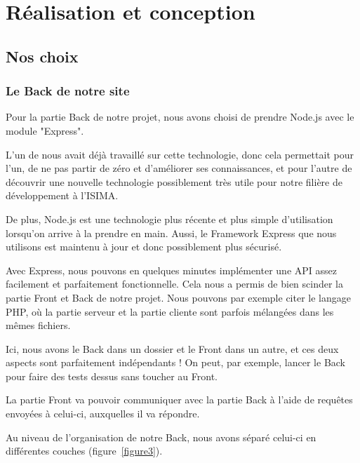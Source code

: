 \documentclass[12pt,french]{article}
\begin{document}
\section{Réalisation et conception}

\subsection{Nos choix}

\subsubsection{Le Back de notre site}

Pour la partie \gls{Back} de notre projet, nous avons choisi de prendre Node.js avec le module "Express".

\medskip

L'un de nous avait déjà travaillé sur cette technologie, donc cela permettait pour l'un, de ne pas partir de zéro et d'améliorer ses connaissances, et pour l'autre de découvrir une nouvelle technologie possiblement très utile pour notre filière de développement à l'ISIMA.

\medskip

De plus, Node.js est une technologie plus récente et plus simple d'utilisation lorsqu'on arrive à la prendre en main. Aussi, le \gls{Framework} Express que nous utilisons est maintenu à jour et donc possiblement plus sécurisé.

\medskip

Avec Express, nous pouvons en quelques minutes implémenter une \gls{API} assez facilement et parfaitement fonctionnelle. Cela nous a permis de bien scinder la partie \gls{Front} et \gls{Back} de notre projet.
Nous pouvons par exemple citer le langage PHP, où la partie serveur et la partie cliente sont parfois mélangées dans les mêmes fichiers.

Ici, nous avons le \gls{Back} dans un dossier et le \gls{Front} dans un autre, et ces deux aspects sont parfaitement indépendants ! On peut, par exemple, lancer le \gls{Back} pour faire des tests dessus sans toucher au \gls{Front}.

La partie \gls{Front} va pouvoir communiquer avec la partie \gls{Back} à l'aide de requêtes envoyées à celui-ci, auxquelles il va répondre.

\bigskip

Au niveau de l'organisation de notre \gls{Back}, nous avons séparé celui-ci en différentes couches (figure~\ref{figure3}).
\end{document}
